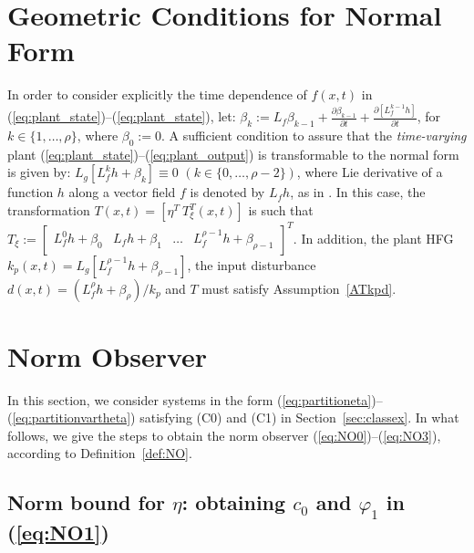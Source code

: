 \documentclass{rncauth}
\begin{document}
\section{Geometric Conditions for Normal Form\label{Geometric}}

In order to consider explicitly the time dependence of $f(x,t)$ in
(\ref{eq:plant_state})--(\ref{eq:plant_state}), let:
%
$\beta_k\!:=\!L_f\beta_{k-1}+\frac{\partial \beta_{k-1}}{\partial
t} + \frac{\partial [L_f^{k-1}h]}{\partial t}$,
%
for $k\!\in\!\{1,\ldots,\rho\}$, where $\beta_0\!:=\!0$.
%
A sufficient condition to assure that the \emph{time-varying}
plant (\ref{eq:plant_state})--(\ref{eq:plant_output}) is
transformable to the normal form is given by: $L_g[L_f^k h +
\beta_k]\!\equiv\!0$ $(k\!\in\!\{0,\ldots,\rho-2\})$, where Lie
derivative of a function $h$ along a vector field $f$ is denoted
by $L_f h$, as in \cite[pp.~510]{K:02}. In this case, the
transformation $T(x,t)\!=\![\eta^T \ T_\xi^T(x,t)]$ is such that
$T_\xi\!:=\!\left[\begin{array}{cccc}L_f^0 h\!+\!\beta_0 & L_f
h\!+\!\beta_1 & \ldots &
L_f^{\rho\!-\!1}h\!+\!\beta_{\rho-1}\!\end{array}\right]^T$. %
%
In addition, the plant HFG
$k_p(x,t)=L_g[L_f^{\rho-1}h+\beta_{\rho-1}]$, the input
disturbance $d(x,t)=(L_f^{\rho}h\!+\!\beta_\rho)/k_p$ and $T$ must
satisfy Assumption~\ref{ATkpd}. %




\section{Norm Observer\label{appendixA}}
In this section, we consider systems in the form
(\ref{eq:partitioneta})--(\ref{eq:partitionvartheta}) satisfying
(C0) and (C1) in Section~\ref{sec:classex}. In what follows, we
give the steps to obtain the norm observer
(\ref{eq:NO0})--(\ref{eq:NO3}), according to
Definition~\ref{def:NO}.


\subsection{Norm bound for $\eta$: obtaining $c_0$ and $\varphi_1$ in (\ref{eq:NO1})}
\end{document}
